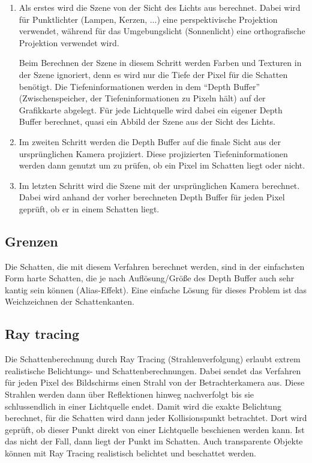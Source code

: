 \begin{enumerate}
 \item Als erstes wird die Szene von der Sicht des Lichts aus berechnet. Dabei wird für Punktlichter
       (Lampen, Kerzen, ...) eine perspektivische Projektion verwendet, während für das Umgebungslicht
       (Sonnenlicht) eine orthografische Projektion verwendet wird.

       Beim Berechnen der Szene in diesem Schritt werden Farben und Texturen in der Szene ignoriert,
       denn es wird nur die Tiefe der Pixel für die Schatten benötigt. Die Tiefeninformationen werden
       in dem "`Depth Buffer"' (Zwischenspeicher, der Tiefeninformationen zu Pixeln hält) auf
       der Grafikkarte abgelegt. Für jede Lichtquelle wird dabei ein eigener Depth Buffer berechnet,
       quasi ein Abbild der Szene aus der Sicht des Lichts.
 \item Im zweiten Schritt werden die Depth Buffer auf die finale Sicht aus der ursprünglichen Kamera
       projiziert. Diese projizierten Tiefeninformationen werden dann genutzt um zu prüfen, ob ein
       Pixel im Schatten liegt oder nicht.
 \item Im letzten Schritt wird die Szene mit der ursprünglichen Kamera berechnet. Dabei wird anhand
       der vorher berechneten Depth Buffer für jeden Pixel geprüft, ob er in einem Schatten liegt.
\end{enumerate}

\cite{shadowvol2014}

\subsection*{Grenzen}

Die Schatten, die mit diesem Verfahren berechnet werden, sind in der einfachsten Form harte Schatten,
die je nach Auflösung/Größe des Depth Buffer auch sehr kantig sein können (Alias-Effekt). Eine
einfache Lösung für dieses Problem ist das Weichzeichnen der Schattenkanten.

\subsection{Ray tracing}

Die Schattenberechnung durch Ray Tracing (Strahlenverfolgung) erlaubt extrem realistische Belichtungs-
und Schattenberechnungen.
Dabei sendet das Verfahren für jeden Pixel des Bildschirms einen Strahl von der Betrachterkamera aus.
Diese Strahlen werden dann über Reflektionen hinweg nachverfolgt bis sie schlussendlich in einer
Lichtquelle endet. Damit wird die exakte Belichtung berechnet, für die Schatten wird dann jeder
Kollisionspunkt betrachtet. Dort wird geprüft, ob dieser Punkt direkt von einer Lichtquelle
beschienen werden kann. Ist das nicht der Fall, dann liegt der Punkt im Schatten. Auch transparente
Objekte können mit Ray Tracing realistisch belichtet und beschattet werden. \cite{raytracing2014}

